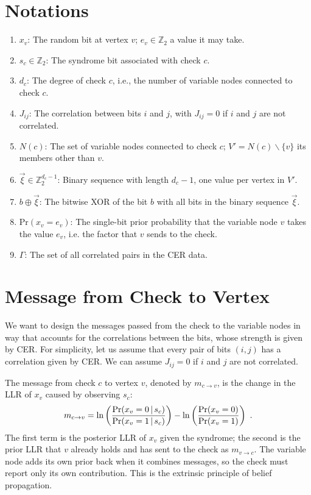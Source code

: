 \documentclass{article}
\def\ts{\thinspace}
\def\P{\text{Pr}}
\begin{document}
\section{Notations}
\begin{enumerate}
    \item $x_v$: The random bit at vertex $v$; $e_v \in \mathbb{Z}_{2}$ a value it may take.
    \item $s_c \in \mathbb{Z}_{2}$: The syndrome bit associated with check $c$.
    \item $d_c$: The degree of check $c$, i.e., the number of variable nodes connected to check $c$.
    \item $J_{ij}$: The correlation between bits $i$ and $j$, with $J_{ij} = 0$ if $i$ and $j$ are not correlated.
    \item $N(c)$: The set of variable nodes connected to check $c$; $V' = N(c) \backslash \{v\}$ its members other than $v$.
    \item $\vec{\xi} \in \mathbb{Z}_{2}^{d_{c}-1}$: Binary sequence with length $d_c - 1$, one value per vertex in $V'$.
    \item $b \oplus \vec{\xi}$: The bitwise XOR of the bit $b$ with all bits in the binary sequence $\vec{\xi}$.
    \item $\P(x_{v} = e_{v})$: The single-bit prior probability that the variable node $v$ takes the value $e_v$, i.e. the factor that $v$ sends to the check.
    \item $\Gamma$: The set of all correlated pairs in the CER data.
\end{enumerate}

\section{Message from Check to Vertex}
We want to design the messages passed from the check to the variable nodes in way that accounts for the correlations between the bits, whose strength is given by CER. For simplicity, let us assume that every pair of bits $(i, j)$ has a correlation given by CER. We can assume $J_{ij} = 0$ if $i$ and $j$ are not correlated.

The message from check $c$ to vertex $v$, denoted by $m_{c \to v}$, is the change in the LLR of $x_v$ caused by observing $s_c$:
\begin{gather}
    m_{c \to v} = \ln\left(\dfrac{\P(x_{v} = 0 \ts|\ts s_{c})}{\P(x_{v} = 1 \ts|\ts s_{c})}\right) - \ln\left(\dfrac{\P(x_{v} = 0)}{\P(x_{v} = 1)}\right) ~. \label{eq:message_check_to_vertex}
\end{gather}
The first term is the posterior LLR of $x_v$ given the syndrome; the second is the prior LLR that $v$ already holds and has sent to the check as $m_{v \to c}$. The variable node adds its own prior back when it combines messages, so the check must report only its own contribution. This is the extrinsic principle of belief propagation.
\end{document}
